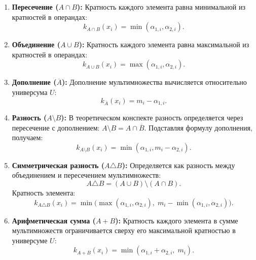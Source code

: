 \documentclass[14pt, a4paper]{extarticle}
\begin{document}
	\begin{enumerate}
		\item {\bf Пересечение ($A \cap B$):}
		Кратность каждого элемента равна минимальной из кратностей в операндах:
		\begin{equation}
			k_{A \cap B}(x_i) = \min(\alpha_{1,i}, \alpha_{2,i}).
		\end{equation}
		
		\item {\bf Объединение ($A \cup B$):}
		Кратность каждого элемента равна максимальной из кратностей в операндах:
		\begin{equation}
			k_{A \cup B}(x_i) = \max(\alpha_{1,i}, \alpha_{2,i}).
		\end{equation}
		
		\item {\bf Дополнение ($\overline{A}$):}
		Дополнение мультимножества вычисляется относительно универсума $U$:
		\begin{equation}
			k_{\overline{A}}(x_i) = m_i - \alpha_{1,i}.
		\end{equation}
		
		\item {\bf Разность ($A \setminus B$):}
		В теоретическом конспекте разность определяется через пересечение с дополнением: $A \setminus B = A \cap \overline{B}$. Подставляя формулу дополнения, получаем:
		\begin{equation}
			k_{A \setminus B}(x_i) = \min(\alpha_{1,i}, m_i - \alpha_{2,i}).
		\end{equation}
		
		\item {\bf Симметрическая разность ($A \triangle B$):}
		Определяется как разность между объединением и пересечением мультимножеств:
		\begin{equation}
			A \triangle B = (A \cup B) \setminus (A \cap B).
		\end{equation}
		Кратность элемента:
		\begin{equation}
			k_{A \triangle B}(x_i) = \min\Big(\max(\alpha_{1,i}, \alpha_{2,i}), \; m_i - \min(\alpha_{1,i}, \alpha_{2,i})\Big).
		\end{equation}
		
		\item {\bf Арифметическая сумма ($A + B$):}
		Кратность каждого элемента в сумме мультимножеств ограничивается сверху его максимальной кратностью в универсуме $U$:
		\begin{equation}
			k_{A + B}(x_i) = \min(\alpha_{1,i} + \alpha_{2,i}, \; m_i).
		\end{equation}
		

\end{enumerate}
\end{document}
